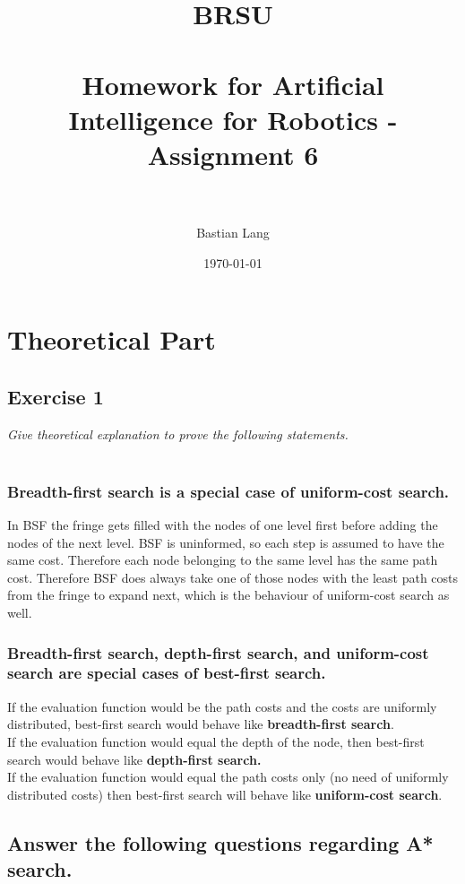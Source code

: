 \documentclass[paper=a4, fontsize=11pt]{scrartcl} %
\title{	
\normalfont \normalsize 
\textsc{BRSU} \\ [25pt] %
\horrule{0.5pt} \\[0.4cm] %
\huge Homework for Artificial Intelligence for Robotics - Assignment 6 \\ %
\horrule{2pt} \\[0.5cm] %
}
\author{Bastian Lang} %
\date{\normalsize\today} %
\numberwithin{equation}{section} %
\numberwithin{figure}{section} %
\numberwithin{table}{section} %
\begin{document}
\maketitle %

\section{Theoretical Part}
\subsection{Exercise 1}
\emph{Give theoretical explanation to prove the following statements.}\\\\

\subsubsection{Breadth-first search is a special case of uniform-cost search.}
In BSF the fringe gets filled with the nodes of one level first before adding the nodes of the next level. BSF is uninformed, so each step is assumed to have the same cost. Therefore each node belonging to the same level has the same path cost. Therefore BSF does always take one of those nodes with the least path costs from the fringe to expand next, which is the behaviour of uniform-cost search as well.

\subsubsection{Breadth-first search, depth-first search, and uniform-cost search are special cases of
best-first search.}
If the evaluation function would be the path costs and the costs are uniformly distributed, best-first search would behave like \textbf{breadth-first search}.\\
If the evaluation function would equal the depth of the node, then best-first search would behave like \textbf{depth-first search.}\\
If the evaluation function would equal the path costs only (no need of uniformly distributed costs) then best-first search will behave like \textbf{uniform-cost search}.

\subsection{Answer the following questions regarding A* search.}
\end{document}
